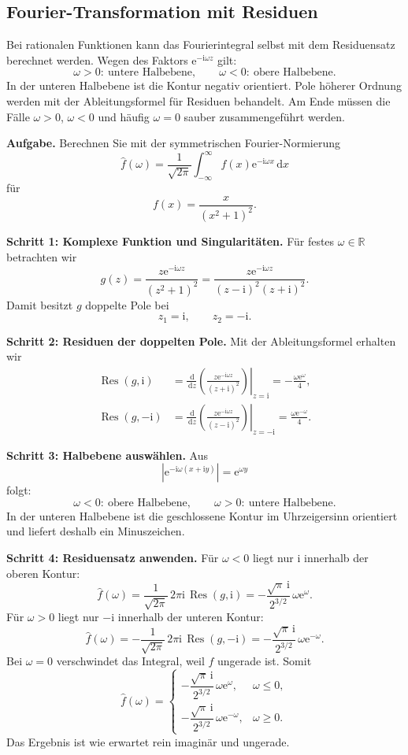 \documentclass[11pt,a4paper]{article}
\newcommand{\R}{\mathbb R}
\newcommand{\ii}{\mathrm i}
\newcommand{\ee}{\mathrm e}
\newcommand{\dd}{\,\mathrm d}
\newcommand{\Res}{\operatorname{Res}}
\newcommand{\1}{\mathbf 1}
\begin{document}
{\subsection{Fourier-Transformation mit Residuen}
Bei rationalen Funktionen kann das Fourierintegral selbst mit dem Residuensatz
berechnet werden. Wegen des Faktors $\ee^{-\ii\omega z}$ gilt:
\[
\omega>0:\ \text{untere Halbebene},\qquad
\omega<0:\ \text{obere Halbebene}.
\]
In der unteren Halbebene ist die Kontur negativ orientiert. Pole höherer Ordnung
werden mit der Ableitungsformel für Residuen behandelt. Am Ende müssen die Fälle
$\omega>0$, $\omega<0$ und häufig $\omega=0$ sauber zusammengeführt werden.

\begin{beispielbox}[title={Vorgerechnetes Prüfungsbeispiel: Aufgabe 14 (2025) -- Fourier-Transformation mit Residuen}]
\textbf{Aufgabe.} Berechnen Sie mit der symmetrischen Fourier-Normierung
\[
\widehat f(\omega)
=\frac1{\sqrt{2\pi}}\int_{-\infty}^{\infty}
f(x)\ee^{-\ii\omega x}\dd x
\]
für
\[
f(x)=\frac{x}{(x^2+1)^2}.
\]

\textbf{Schritt 1: Komplexe Funktion und Singularitäten.}
Für festes $\omega\in\R$ betrachten wir
\[
g(z)=\frac{z\ee^{-\ii\omega z}}{(z^2+1)^2}
=\frac{z\ee^{-\ii\omega z}}{(z-\ii)^2(z+\ii)^2}.
\]
Damit besitzt $g$ doppelte Pole bei
\[
z_1=\ii,\qquad z_2=-\ii.
\]

\textbf{Schritt 2: Residuen der doppelten Pole.}
Mit der Ableitungsformel erhalten wir
\[
\begin{aligned}
\Res(g,\ii)
&=\left.
\frac{\dd}{\dd z}
\left(\frac{z\ee^{-\ii\omega z}}{(z+\ii)^2}\right)
\right|_{z=\ii}
=-\frac{\omega\ee^\omega}{4},\\
\Res(g,-\ii)
&=\left.
\frac{\dd}{\dd z}
\left(\frac{z\ee^{-\ii\omega z}}{(z-\ii)^2}\right)
\right|_{z=-\ii}
=\frac{\omega\ee^{-\omega}}{4}.
\end{aligned}
\]

\textbf{Schritt 3: Halbebene auswählen.}
Aus
\[
\left|\ee^{-\ii\omega(x+\ii y)}\right|=\ee^{\omega y}
\]
folgt:
\[
\omega<0:\ \text{obere Halbebene},
\qquad
\omega>0:\ \text{untere Halbebene}.
\]
In der unteren Halbebene ist die geschlossene Kontur im Uhrzeigersinn
orientiert und liefert deshalb ein Minuszeichen.

\textbf{Schritt 4: Residuensatz anwenden.}
Für $\omega<0$ liegt nur $\ii$ innerhalb der oberen Kontur:
\[
\widehat f(\omega)
=\frac1{\sqrt{2\pi}}\,2\pi\ii\,\Res(g,\ii)
=-\frac{\sqrt{\pi}\,\ii}{2^{3/2}}\,\omega\ee^\omega.
\]
Für $\omega>0$ liegt nur $-\ii$ innerhalb der unteren Kontur:
\[
\widehat f(\omega)
=-\frac1{\sqrt{2\pi}}\,2\pi\ii\,\Res(g,-\ii)
=-\frac{\sqrt{\pi}\,\ii}{2^{3/2}}\,\omega\ee^{-\omega}.
\]
Bei $\omega=0$ verschwindet das Integral, weil $f$ ungerade ist. Somit
\[
\boxed{
\widehat f(\omega)=
\begin{cases}
-\dfrac{\sqrt{\pi}\,\ii}{2^{3/2}}\,\omega\ee^\omega,
&\omega\leq0,\\[2mm]
-\dfrac{\sqrt{\pi}\,\ii}{2^{3/2}}\,\omega\ee^{-\omega},
&\omega\geq0.
\end{cases}
}
\]
Das Ergebnis ist wie erwartet rein imaginär und ungerade.
\end{beispielbox}

}
\end{document}
